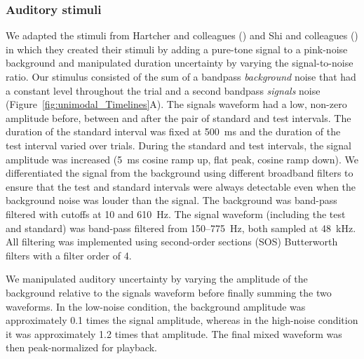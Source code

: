 \documentclass{biorxiv}
\providecommand{\citeyearpar}[1]{(\citeyear{#1})}
\begin{document}

\subsubsection{Auditory stimuli}

We adapted the stimuli from Hartcher and colleagues \citeyearpar{hartcher2014duration} and Shi and colleagues \citeyearpar{shi2013reducing} in which they created their stimuli by adding a pure-tone signal to a pink-noise background and manipulated duration uncertainty by varying the signal-to-noise ratio. Our stimulus consisted of the sum of a bandpass {\em background} noise that had a constant level throughout the trial and a second bandpass {\em signals} noise (Figure~\ref{fig:unimodal_Timelines}A). The signals waveform had a low, non-zero amplitude before, between and after the pair of standard and test intervals. The duration of the standard interval was fixed at 500~ms and the duration of the test interval varied over trials. During the standard and test intervals, the signal amplitude was increased (5~ms cosine ramp up, flat peak, cosine ramp down). We differentiated the signal from the background using different broadband filters to ensure that the test and standard intervals were always detectable even when the background noise was louder than the signal. The background was band-pass filtered with cutoffs at 10 and 610~Hz. The signal waveform (including the test and standard) was band-pass filtered from 150--775~Hz, both sampled at 48~kHz. All filtering was implemented using second-order sections (SOS) Butterworth filters with a filter order of 4.

We manipulated auditory uncertainty by varying the amplitude of the background relative to the signals waveform before finally summing the two waveforms. In the low-noise condition, the background amplitude was approximately 0.1 times the signal amplitude, whereas in the high-noise condition it was approximately 1.2 times that amplitude. The final mixed waveform was then peak-normalized for playback.
\end{document}
